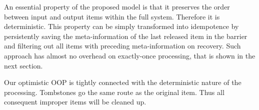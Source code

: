 \label {fs-short-discussion}

An essential property of the proposed model is that it preserves the order between input and output items within the full system. Therefore it is deterministic. This property can be simply transformed into idempotence by persistently saving the meta-information of the last released item in the barrier and filtering out all items with preceding meta-information on recovery. Such approach has almost no overhead on exactly-once processing, that is shown in the next section. 

Our optimistic OOP is tightly connected with the deterministic nature of the processing. Tombstones go the same route as the original item. Thus all consequent improper items will be cleaned up.
